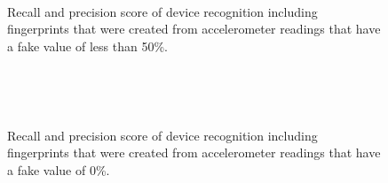 \begin{figure}
	\ContinuedFloat
	\,
	\,
	\caption{Recall and precision score of device recognition including fingerprints that were created from accelerometer readings that have a fake value of less than 50\%.}
\end{figure}
\begin{figure}[htb]
	\,
	\,
\end{figure}
\begin{figure}
	\ContinuedFloat
	\,
	\,
	\caption{Recall and precision score of device recognition including fingerprints that were created from accelerometer readings that have a fake value of 0\%.}
\end{figure}
